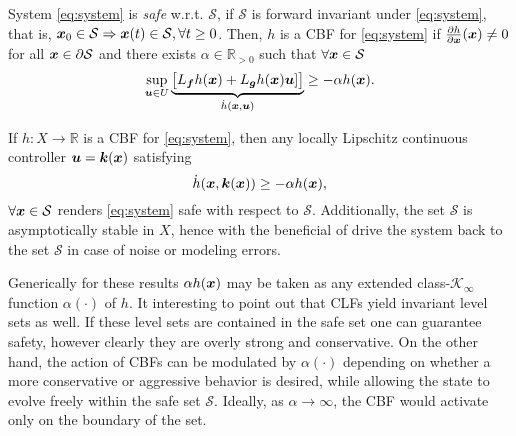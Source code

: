 \begin{definition} System \eqref{eq:system} is \textit{safe} w.r.t. $\mathcal{S}$, if $\mathcal{S}$ is forward invariant under \eqref{eq:system}, that is, $\boldsymbol{x}_0\in\mathcal{S}\Rightarrow \boldsymbol{x}(t)\in\mathcal{S}, \forall t\geq0$.
Then, $h$ is a CBF for \eqref{eq:system} if $\frac{\partial{h}}{\partial \boldsymbol{x}} (\boldsymbol{x})\neq 0$ for all $\boldsymbol{x}\in \partial{\mathcal{S}}$ and there exists $\alpha \in \mathbb{R}_{>0}$ such that $\forall \boldsymbol{x} \in \mathcal{S}$
\begin{equation}
\sup_{\boldsymbol{u}\in U} \underbrace{ 
\begin{bmatrix}
L_{\boldsymbol{f}}h(\boldsymbol{x}) + L_{\boldsymbol{g}}h(\boldsymbol{x})\boldsymbol{u}] 
\end{bmatrix}}_{\dot{h}(\boldsymbol{x},\boldsymbol{u})}\geq -\alpha h(\boldsymbol{x}).
\end{equation}


\begin{theorem}
    \label{th:cbf}If $h : X \to \mathbb{R}$ is a CBF for \eqref{eq:system}, then any locally Lipschitz continuous controller $\boldsymbol{u} = \boldsymbol{k}(\boldsymbol{x})$ satisfying
\begin{equation}
\dot{h}(\boldsymbol{x},\boldsymbol{k}(\boldsymbol{x}))\geq -\alpha h(\boldsymbol{x}),
\label{cond:2}
\end{equation}
$\forall{\boldsymbol{x}}\in\mathcal{S}$ renders \eqref{eq:system} safe with respect to $\mathcal{S}$. Additionally, the set $\mathcal{S}$ is asymptotically stable in $X$, hence with the beneficial of drive the system back to the set $\mathcal{S}$ in case of noise or modeling errors.
\end{theorem}
\end{definition}
\noindent
Generically for these results $\alpha h(\boldsymbol{x})$ may be taken as any extended class-$\mathcal{K}_{\infty}$ function $\alpha(\cdot)$ of $h$.
It interesting to point out that CLFs yield invariant level sets as well. If these level sets are contained in the safe set one can guarantee safety, however clearly they are overly strong and conservative. On the other hand, the action of CBFs can be modulated by $\alpha(\cdot)$ depending on whether a more conservative or aggressive behavior is desired, while allowing the state to evolve freely within the safe set $\mathcal{S}$. Ideally, as $\alpha \to \infty$, the CBF would activate only on the boundary of the set.


